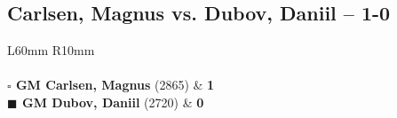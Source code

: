 \documentclass[../main.tex]{subfiles}
\begin{document}
\subsection{Carlsen, Magnus vs. Dubov, Daniil -- 1-0}

\begin{multicols*}{2}

\begin{tabular}{L{60mm} R{10mm}}
\\ 
\\[3mm]
\textbf{$\square$ \hspace{2mm}  GM Carlsen, Magnus} (2865)  & \textbf{1}\\ 
\textbf{$\blacksquare$ \hspace{2mm}  GM Dubov, Daniil} (2720)  & \textbf{0}\\ 
\end{tabular}

\end{multicols*}
\newpage
\end{document}
